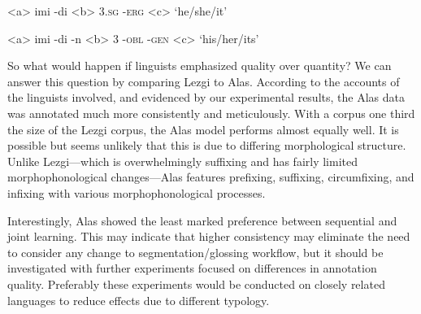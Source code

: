 \begin{singlespace}

\label{ex:Lezgi2}
\a<a> imi -di 
\a<b> 3\textsc{.sg} -\textsc{erg}
\a<c> `he/she/it'
\xe

\label{ex:Lezgi3}
\a<a> imi -di -n 
\a<b> 3 -\textsc{obl} -\textsc{gen}
\a<c> `his/her/its'
\xe

\end{singlespace}


So what would happen if linguists emphasized quality over quantity? We can answer this question by comparing Lezgi to Alas. According to the accounts of the linguists involved, and evidenced by our experimental results, the Alas data was annotated much more consistently and meticulously. With a corpus one third the size of the Lezgi corpus, the Alas model performs almost equally well. It is possible but seems unlikely that this is due to differing morphological structure. Unlike Lezgi---which is overwhelmingly suffixing and has fairly limited morphophonological changes---Alas features prefixing, suffixing, circumfixing, and infixing with various morphophonological processes. %

Interestingly, Alas showed the least marked preference between sequential and joint learning. This may indicate that higher consistency may eliminate the need to consider any change to segmentation/glossing workflow, but it should be investigated with further experiments focused on differences in annotation quality. Preferably these experiments would be conducted on closely related languages to reduce effects due to different typology. 



